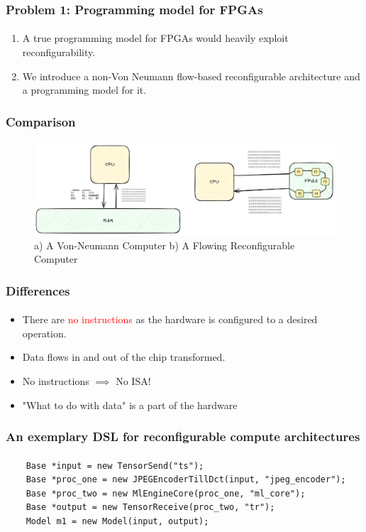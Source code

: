 \documentclass{beamer}
\begin{document}
{\begin{frame}[fragile]
\end{frame}


\begin{frame}[fragile]
\frametitle{Problem 1: Programming model for FPGAs}
\framesubtitle{}
  \begin{enumerate}
    \item A true programming model for FPGAs would heavily exploit
      reconfigurability.
    \item We introduce a non-Von Neumann flow-based reconfigurable architecture and a programming model
      for it.
  \end{enumerate}
\end{frame}

\begin{frame}[fragile]
  \frametitle{Comparison}
  \framesubtitle{}
  \begin{figure}
    \centering
    \includegraphics[width=1.0\textwidth]{images/flow.png}
    \caption{a) A Von-Neumann Computer b) A Flowing Reconfigurable Computer}
    \label{}
  \end{figure}
\end{frame}

\begin{frame}[fragile]
  \frametitle{Differences}
  \framesubtitle{}

  \begin{itemize}
    \item There are \textcolor{red}{no instructions} as the hardware
  is configured to a desired operation. 
      
    \item Data flows in and out of the chip transformed. 

    \item No instructions $\implies$ No ISA!

    \item "What to do with data" is a part of the hardware
  \end{itemize}
\end{frame}

\begin{frame}[fragile]
  \frametitle{An exemplary DSL for reconfigurable compute architectures}
\framesubtitle{}
  \begin{lstlisting}
    Base *input = new TensorSend("ts");
    Base *proc_one = new JPEGEncoderTillDct(input, "jpeg_encoder");
    Base *proc_two = new MlEngineCore(proc_one, "ml_core");
    Base *output = new TensorReceive(proc_two, "tr");
    Model m1 = new Model(input, output);
  \end{lstlisting}
\end{frame}

}
\end{document}
